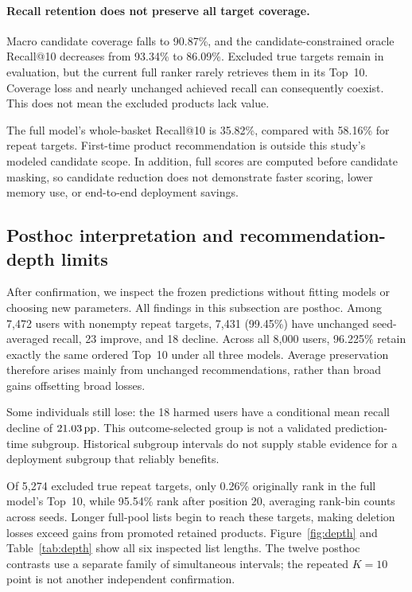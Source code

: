 \paragraph{Recall retention does not preserve all target coverage.}
Macro candidate coverage falls to 90.87\%, and the candidate-constrained oracle Recall@10 decreases from 93.34\% to 86.09\%. Excluded true targets remain in evaluation, but the current full ranker rarely retrieves them in its Top~10. Coverage loss and nearly unchanged achieved recall can consequently coexist. This does not mean the excluded products lack value.

The full model's whole-basket Recall@10 is 35.82\%, compared with 58.16\% for repeat targets. First-time product recommendation is outside this study's modeled candidate scope. In addition, full scores are computed before candidate masking, so candidate reduction does not demonstrate faster scoring, lower memory use, or end-to-end deployment savings.

\subsection{Posthoc interpretation and recommendation-depth limits}
\label{sec:posthoc}
After confirmation, we inspect the frozen predictions without fitting models or choosing new parameters. All findings in this subsection are posthoc. Among 7,472 users with nonempty repeat targets, 7,431 (99.45\%) have unchanged seed-averaged recall, 23 improve, and 18 decline. Across all 8,000 users, 96.225\% retain exactly the same ordered Top~10 under all three models. Average preservation therefore arises mainly from unchanged recommendations, rather than broad gains offsetting broad losses.

Some individuals still lose: the 18 harmed users have a conditional mean recall decline of $21.03\,\text{pp}$. This outcome-selected group is not a validated prediction-time subgroup. Historical subgroup intervals do not supply stable evidence for a deployment subgroup that reliably benefits.

Of 5,274 excluded true repeat targets, only 0.26\% originally rank in the full model's Top~10, while 95.54\% rank after position 20, averaging rank-bin counts across seeds. Longer full-pool lists begin to reach these targets, making deletion losses exceed gains from promoted retained products. Figure~\ref{fig:depth} and Table~\ref{tab:depth} show all six inspected list lengths. The twelve posthoc contrasts use a separate family of simultaneous intervals; the repeated $K=10$ point is not another independent confirmation.

